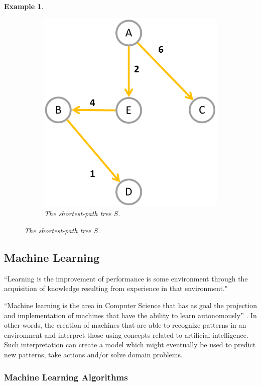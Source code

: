 \documentclass[12pt]{article}
\newtheorem{example}{Example}[section]
\begin{document}
\begin{example}
\begin{figure}[H]
\begin{subfigure}{.4\linewidth}
			\includegraphics[width=\linewidth]{spa-tree}
			\captionsetup{justification=centering}
			\caption{The shortest-path tree $S$.}
			\label{fig:spa-tree}
		\end{subfigure}
	\end{figure}
\end{example}

\subsection{Machine Learning}
“Learning is the improvement of performance is some environment through the acquisition of knowledge resulting from experience in that environment." \cite{pat1996}

“Machine learning is the area in Computer Science that has as goal the projection and implementation of machines that have the ability to learn autonomously” \cite{hot2009}. In other words, the creation of machines that are able to recognize patterns in an environment and interpret those using concepts related to artificial intelligence. Such interpretation can create a model which might eventually be used to predict new patterns, take actions and/or solve domain problems.

\subsubsection{Machine Learning Algorithms}
\end{document}

